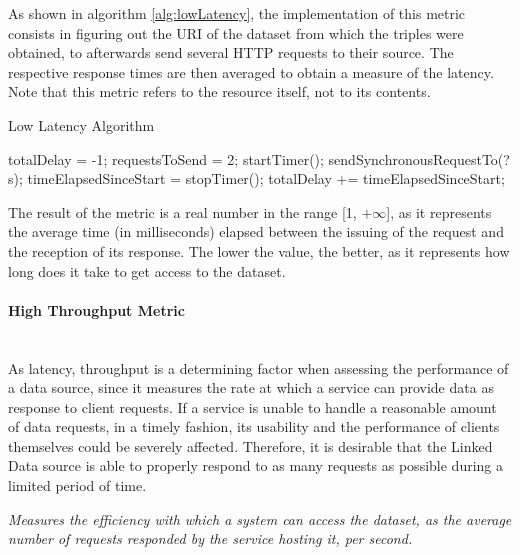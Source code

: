 As shown in algorithm \ref{alg:lowLatency}, the implementation of this metric consists in figuring out the URI of the dataset from which the triples were obtained, to afterwards send several HTTP requests to their source. The respective response times are then averaged to obtain a measure of the latency. Note that this metric refers to the resource itself, not to its contents.
\begin{algorithm}
\caption{Low Latency Algorithm} \label{alg:lowLatency}
\begin{algorithmic}[1]
\State totalDelay = -1;
\State requestsToSend = 2;
\EndProcedure
{}
\State startTimer();
\State sendSynchronousRequestTo(?s);
\EndFor
\State timeElapsedSinceStart = stopTimer();
\State totalDelay += timeElapsedSinceStart;
\EndIf
{}
\EndProcedure
\end{algorithmic}
\end{algorithm}
The result of the metric is a real number in the range [1, $+\infty$], as it represents the average time (in  milliseconds) elapsed between the issuing of the request and the reception of its response. The lower the value, the better, as it represents how long does it take to get access to the dataset.


\paragraph{High Throughput Metric} ~\\ %
As latency, throughput is a determining factor when assessing the performance of a data source, since it measures the rate at which a service can provide data as response to client requests. If a service is unable to handle a reasonable amount of data requests, in a timely fashion, its usability and the performance of clients themselves could be severely affected. Therefore, it is desirable that the Linked Data source is able to properly respond to as many requests as possible during a limited period of time.
\begin{mdframed}[style=metricdefinition]
\emph{Measures the efficiency with which a system can access the dataset, as the average number of requests responded by the service hosting it, per second.}
\end{mdframed}

